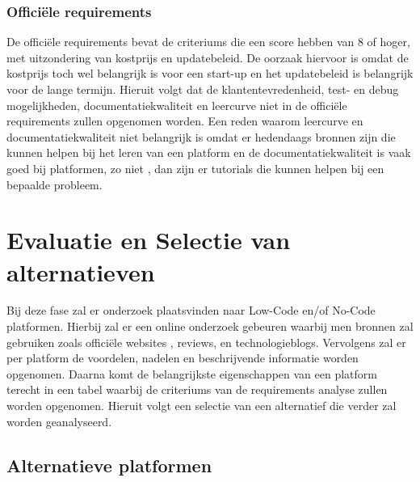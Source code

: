 \subsubsection*{Officiële requirements}
De officiële requirements bevat de criteriums die een score hebben van 8 of hoger, 
met uitzondering van kostprijs en updatebeleid. De oorzaak hiervoor is omdat de 
kostprijs toch wel belangrijk is voor een start-up en het updatebeleid is belangrijk voor 
de lange termijn. Hieruit volgt dat de klantentevredenheid, test- en debug mogelijkheden, 
documentatiekwaliteit en leercurve niet in de officiële requirements zullen opgenomen worden. 
Een reden waarom leercurve en documentatiekwaliteit niet belangrijk is omdat er hedendaags bronnen 
zijn die kunnen helpen bij het leren van een platform en de documentatiekwaliteit is vaak goed bij platformen, zo niet , 
dan zijn er tutorials die kunnen helpen bij een bepaalde probleem.



\section*{Evaluatie en Selectie van alternatieven}
\label{sec:evaluatie-en-selectie-van-alternatieven}
Bij deze fase zal er onderzoek plaatsvinden naar Low-Code en/of No-Code platformen. 
Hierbij zal er een online onderzoek gebeuren waarbij men bronnen zal gebruiken zoals 
officiële websites , reviews, en technologieblogs. Vervolgens zal er per platform de 
voordelen, nadelen en beschrijvende informatie worden opgenomen. Daarna komt 
de belangrijkste eigenschappen van een platform terecht in een tabel waarbij de criteriums
van de requirements analyse zullen worden opgenomen. Hieruit volgt een selectie van een 
alternatief die verder zal worden geanalyseerd.
\subsection*{Alternatieve platformen}
\label{subsec:alternatieve-platformen}

